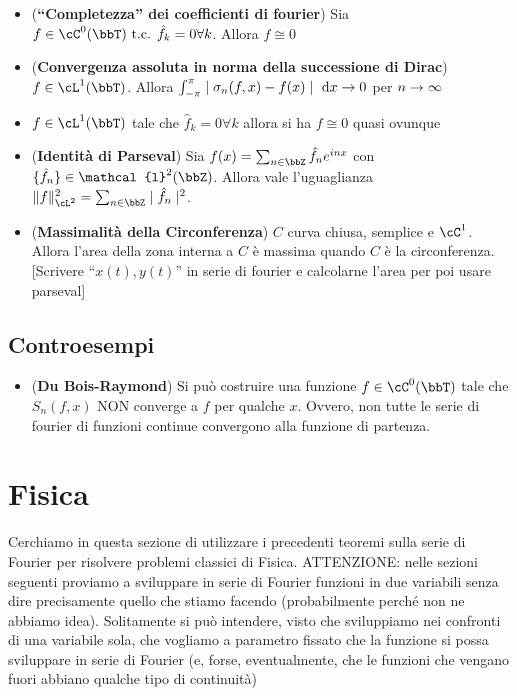 \documentclass[a4paper,NoNotes,GeneralMath]{stdmdoc}
\newcommand{\intpie}{\int_{-\pi}^\pi }
\newcommand{\CT}[1]{\cC^{#1}(\bbT)}
\newcommand{\LT}[1]{\cL^{#1}(\bbT)}
\newcommand{\cl}{\mathcal{l}}
\begin{document}
\begin{itemize}
        \item ({\bf ``Completezza'' dei coefficienti di fourier}) Sia $f \in \CT{0} \tc \hat{f}_k = 0 \forall k$. Allora $f \cong 0$
        \item ({\bf Convergenza assoluta in norma della successione di Dirac}) $f \in \LT{1}$. Allora $\intpie \abs{\sigma_n(f, x) - f(x)} \de x \rar 0$ per $n \rightarrow \infty$
        \item $f \in \LT{1}$ tale che $\hat{f}_k = 0 \forall k$ allora si ha $f \cong 0$ quasi ovunque
        \item ({\bf Identità di Parseval}) Sia $f(x) = \sum_{n \in \bbZ} \hat{f}_n e^{inx}$ con $\{\hat{f}_n\} \in \cl^2(\bbZ)$. Allora vale l'uguaglianza $\norm{f}^2_{\cL^2} = \sum_{n \in \bbZ} \abs{\hat{f}_n}^2$.
          \item ({\bf Massimalità della Circonferenza}) $C$ curva chiusa, semplice e $\cC^1$. Allora l'area della zona interna a $C$ è massima quando $C$ è la circonferenza. [Scrivere ``$x(t), y(t)$'' in serie di fourier e calcolarne l'area per poi usare parseval]
        \end{itemize}

        \subsection*{Controesempi}
        \begin{itemize}
        \item ({\bf Du Bois-Raymond}) Si può costruire una funzione $f \in \CT{0}$ tale che $S_n(f, x)$ NON converge a $f$ per qualche $x$. Ovvero, non tutte le serie di fourier di funzioni continue convergono alla funzione di partenza.
        \end{itemize}


        \section*{Fisica}
        Cerchiamo in questa sezione di utilizzare i precedenti teoremi sulla serie di Fourier per risolvere problemi classici di Fisica. ATTENZIONE: nelle sezioni seguenti proviamo a sviluppare in serie di Fourier funzioni in due variabili senza dire precisamente quello che stiamo facendo (probabilmente perché non ne abbiamo idea). Solitamente si può intendere, visto che sviluppiamo nei confronti di una variabile sola, che vogliamo a parametro fissato che la funzione si possa sviluppare in serie di Fourier (e, forse, eventualmente, che le funzioni che vengano fuori abbiano qualche tipo di continuità)
\end{document}
